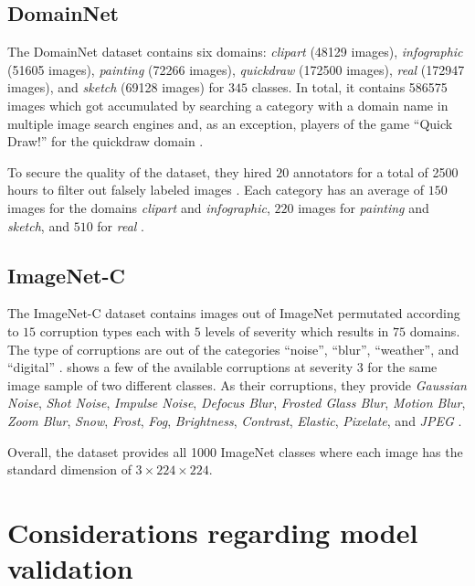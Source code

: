 \subsection{DomainNet}

The DomainNet dataset \citep{PengBXHSW19} contains six domains: \emph{clipart} (\num{48129} images), \emph{infographic} (\num{51605} images), \emph{painting} (\num{72266} images), \emph{quickdraw} (\num{172500} images), \emph{real} (\num{172947} images), and \emph{sketch} (\num{69128} images) for $345$ classes. In total, it contains \num{586575} images  which got accumulated by searching a category with a domain name in multiple image search engines and, as an exception, players of the game ``Quick Draw!'' for the quickdraw domain \citep{PengBXHSW19}.

To secure the quality of the dataset, they hired $20$ annotators for a total of \num{2500} hours to filter out falsely labeled images \citep{PengBXHSW19}. Each category has an average of $150$ images for the domains \emph{clipart} and \emph{infographic}, $220$ images for \emph{painting} and \emph{sketch}, and $510$ for \emph{real} \citep{PengBXHSW19}.

\subsection{ImageNet-C}
The ImageNet-C dataset \citep{HendrycksD19} contains images out of ImageNet \citep{RussakovskyDSKS15} permutated according to $15$ corruption types each with $5$ levels of severity which results in $75$ domains. The type of corruptions are out of the categories ``noise'', ``blur'', ``weather'', and ``digital'' \citep{HendrycksD19}.  shows a few of the available corruptions at severity $3$ for the same image sample of two different classes. As their corruptions, they provide \emph{Gaussian Noise}, \emph{Shot Noise}, \emph{Impulse Noise}, \emph{Defocus Blur}, \emph{Frosted Glass Blur}, \emph{Motion Blur}, \emph{Zoom Blur}, \emph{Snow}, \emph{Frost}, \emph{Fog}, \emph{Brightness}, \emph{Contrast}, \emph{Elastic}, \emph{Pixelate}, and \emph{JPEG} \citep{HendrycksD19}. 

Overall, the dataset provides all \num{1000} ImageNet classes where each image has the standard dimension of $3 \times 224 \times 224$.

\section{Considerations regarding model validation}
\label{sec:considerations}

